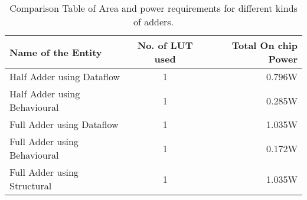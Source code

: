 \begin{table}[H]
\centering
\begin{tabular}{|l|c|r|}
\hline
\textbf{Name of the Entity} & \textbf{No. of LUT used} & \textbf{Total On chip Power}\\
\hline
Half Adder using Dataflow & 1 & 0.796W \\ \hline
Half Adder using Behavioural & 1 & 0.285W \\ \hline
Full Adder using Dataflow & 1 & 1.035W \\ \hline
Full Adder using Behavioural & 1 & 0.172W \\ \hline
Full Adder using Structural & 1 & 1.035W \\ \hline
\end{tabular}
\caption{Comparison Table of Area and power requirements for different kinds of adders.}
\label{tab:1}
\end{table}







